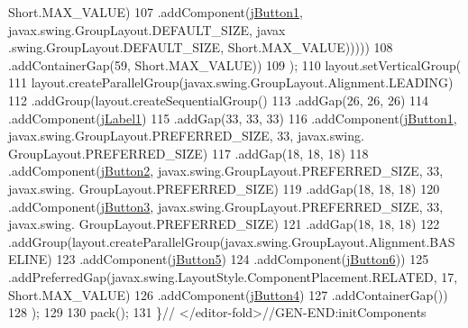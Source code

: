 \begin{DoxyCode}
      Short.MAX\_VALUE)
107                                 .addComponent(\mbox{\hyperlink{class_interfaz_package_1_1_interfaz_admin_a9105aba7ae58736d959752db09b708a7}{jButton1}}, javax.swing.GroupLayout.DEFAULT\_SIZE, javax
      .swing.GroupLayout.DEFAULT\_SIZE, Short.MAX\_VALUE)))))
108                 .addContainerGap(59, Short.MAX\_VALUE))
109         );
110         layout.setVerticalGroup(
111             layout.createParallelGroup(javax.swing.GroupLayout.Alignment.LEADING)
112             .addGroup(layout.createSequentialGroup()
113                 .addGap(26, 26, 26)
114                 .addComponent(\mbox{\hyperlink{class_interfaz_package_1_1_interfaz_admin_a616ba73f041fc46fb10107d67b98f5ad}{jLabel1}})
115                 .addGap(33, 33, 33)
116                 .addComponent(\mbox{\hyperlink{class_interfaz_package_1_1_interfaz_admin_a9105aba7ae58736d959752db09b708a7}{jButton1}}, javax.swing.GroupLayout.PREFERRED\_SIZE, 33, javax.swing.
      GroupLayout.PREFERRED\_SIZE)
117                 .addGap(18, 18, 18)
118                 .addComponent(\mbox{\hyperlink{class_interfaz_package_1_1_interfaz_admin_acc936e9e831e0d280f8bd3d6215d69d1}{jButton2}}, javax.swing.GroupLayout.PREFERRED\_SIZE, 33, javax.swing.
      GroupLayout.PREFERRED\_SIZE)
119                 .addGap(18, 18, 18)
120                 .addComponent(\mbox{\hyperlink{class_interfaz_package_1_1_interfaz_admin_a1c49c5af96e421af2c0e3e773995db35}{jButton3}}, javax.swing.GroupLayout.PREFERRED\_SIZE, 33, javax.swing.
      GroupLayout.PREFERRED\_SIZE)
121                 .addGap(18, 18, 18)
122                 .addGroup(layout.createParallelGroup(javax.swing.GroupLayout.Alignment.BASELINE)
123                     .addComponent(\mbox{\hyperlink{class_interfaz_package_1_1_interfaz_admin_a158621407bca85eb067b4d84fb15f8f8}{jButton5}})
124                     .addComponent(\mbox{\hyperlink{class_interfaz_package_1_1_interfaz_admin_aed43fc05f792f94859d625d8c69e9858}{jButton6}}))
125                 .addPreferredGap(javax.swing.LayoutStyle.ComponentPlacement.RELATED, 17, Short.MAX\_VALUE)
126                 .addComponent(\mbox{\hyperlink{class_interfaz_package_1_1_interfaz_admin_abe45cfffa25b1f68f153eb8dfed74132}{jButton4}})
127                 .addContainerGap())
128         );
129 
130         pack();
131     \}\textcolor{comment}{// </editor-fold>//GEN-END:initComponents}
\end{DoxyCode}
\mbox{\label{class_interfaz_package_1_1_interfaz_admin_aaf879a69301dfeae37ba0aa729170d62}} 

